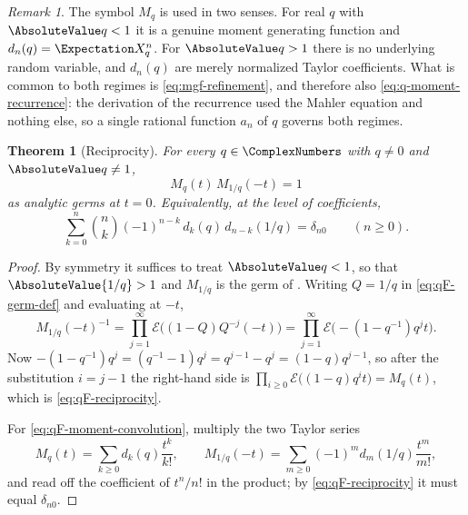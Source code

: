 \documentclass[11pt,a4paper,oneside,openany]{book}
\newtheorem{theorem}{Theorem}[chapter]
\theoremstyle{definition}
\theoremstyle{remark}
\newtheorem{remark}[remark]{Remark}
\begin{document}
\begin{remark}\label{rem:qF-germ-not-mgf}
The symbol $M_q$ is used in two senses.  For real $q$ with $\AbsoluteValue q<1$ it is a
genuine moment generating function and $d_n(q)=\Expectation X_q^n$.  For $\AbsoluteValue q>1$
there is no underlying random variable, and $d_n(q)$ are merely normalized
Taylor coefficients.  What is common to both regimes is \eqref{eq:mgf-refinement},
and therefore also \eqref{eq:q-moment-recurrence}: the derivation of the
recurrence used the Mahler equation and nothing else, so a single rational
function $a_n$ of $q$ governs both regimes.
\end{remark}

\begin{theorem}[Reciprocity]\label{thm:qF-reciprocity}
For every $q\in\ComplexNumbers$ with $q\ne0$ and $\AbsoluteValue q\ne1$,
\begin{equation}\label{eq:qF-reciprocity}
 M_q(t)\,M_{1/q}(-t)=1
\end{equation}
as analytic germs at $t=0$.  Equivalently, at the level of coefficients,
\begin{equation}\label{eq:qF-moment-convolution}
 \sum_{k=0}^{n}\binom nk(-1)^{n-k}\,d_k(q)\,d_{n-k}(1/q)=\delta_{n0}
 \qquad(n\ge0).
\end{equation}
\end{theorem}

\begin{proof}
By symmetry it suffices to treat $\AbsoluteValue q<1$, so that $\AbsoluteValue{1/q}>1$ and
$M_{1/q}$ is the germ of .  Writing $Q=1/q$ in
\eqref{eq:qF-germ-def} and evaluating at $-t$,
\[
 M_{1/q}(-t)^{-1}
 =\prod_{j=1}^{\infty}\mathcal E\bigl((1-Q)Q^{-j}(-t)\bigr)
 =\prod_{j=1}^{\infty}\mathcal E\bigl(-(1-q^{-1})q^{j}t\bigr).
\]
Now $-(1-q^{-1})q^{j}=(q^{-1}-1)q^{j}=q^{j-1}-q^{j}=(1-q)q^{j-1}$, so after the
substitution $i=j-1$ the right-hand side is
$\prod_{i\ge0}\mathcal E\bigl((1-q)q^{i}t\bigr)=M_q(t)$, which is
\eqref{eq:qF-reciprocity}.

For \eqref{eq:qF-moment-convolution}, multiply the two Taylor series
\[
 M_q(t)=\sum_{k\ge0}d_k(q)\frac{t^k}{k!},
 \qquad
 M_{1/q}(-t)=\sum_{m\ge0}(-1)^md_m(1/q)\frac{t^m}{m!},
\]
and read off the coefficient of $t^n/n!$ in the product; by
\eqref{eq:qF-reciprocity} it must equal $\delta_{n0}$.
\end{proof}
\end{document}
